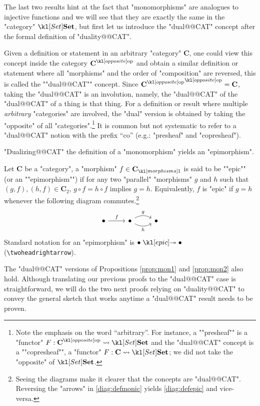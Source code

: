 \documentclass[main.tex]{subfiles}
\begin{document}
The last two results hint at the fact that "monomorphisms" are analogues to injective functions and we will see that they are exactly the same in the "category" $\catSet$, but first let us introduce the "dual@@CAT" concept after the formal definition of "duality@@CAT". 
\begin{defn}[Duality]
	Given a definition or statement in an arbitrary "category" $\mathbf{C}$, one could view this concept inside the category $\op{\mathbf{C}}$ and obtain a similar definition or statement where all "morphisms" and the order of "composition" are reversed, this is called the ""dual@@CAT"" concept. Since $\op{\op{\mathbf{C}}} = \mathbf{C}$, taking the "dual@@CAT" is an involution, namely, the "dual@@CAT" of the "dual@@CAT" of a thing is that thing. For a definition or result where multiple \emph{arbitrary} "categories" are involved, the "dual" version is obtained by taking the "opposite" of all "categories".\footnote{Note the emphasis on the word ``arbitrary''. \AP For instance, a ""presheaf"" is a "functor" $F: \op{\mathbf{C}} \rightsquigarrow \catSet$ and the "dual@@CAT" concept is a ""copresheaf"", a "functor" $F: \mathbf{C} \rightsquigarrow \catSet$; we did not take the "opposite" of $\catSet$.} It is common but not systematic to refer to a "dual@@CAT" notion with the prefix ``co'' (e.g.: "presheaf" and "copresheaf").
\end{defn}
"Dualizing@@CAT" the definition of a "monomorphism" yields an "epimorphism".
\begin{defn}[Epimorphism]
	Let $\mathbf{C}$ be a "category", a "morphism" $f \in \mor{\mathbf{C}}$ is said to be ""epic"" (or an ""epimorphism"") if for any two "parallel" "morphisms" $g$ and $h$ such that $(g,f), (h,f) \in \mathbf{C}_2$, $g\circ f = h\circ f$ implies $g = h$. Equivalently, $f$ is "epic" if $g = h$ whenever the following diagram commutes.\footnote{Seeing the diagrams make it clearer that the concepts are "dual@@CAT". Reversing the "arrows" in \eqref{diag:defmonic} yields \eqref{diag:defepic} and vice-versa.}
	\begin{equation}\label{diag:defepic}
	\begin{tikzcd}
	\bullet \arrow[r, "f"] & \bullet \arrow[r, "g", bend left] \arrow[r, "h"', bend right] & \bullet
	\end{tikzcd}
	\end{equation}
	Standard notation for an "epimorphism" is $ \bullet \epi \bullet$ (\verb!\twoheadrightarrow!).
\end{defn}
The "dual@@CAT" versions of Propositions \ref{prop:mon1} and \ref{prop:mon2} also hold. Although translating our previous proofs to the "dual@@CAT" case is straightforward, we will do the two next proofs relying on "duality@@CAT" to convey the general sketch that works anytime a "dual@@CAT" result needs to be proven.
\end{document}
